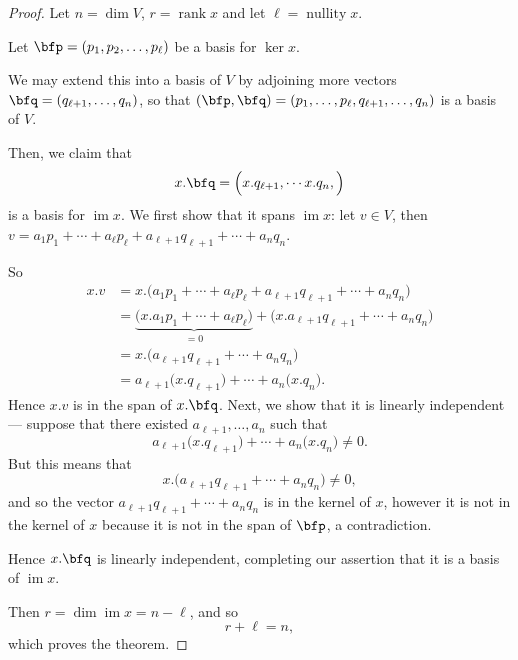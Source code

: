 \documentclass{article}
\DeclareMathOperator{\im}{im}
\DeclareMathOperator{\rank}{rank}
\DeclareMathOperator{\nullity}{nullity}
\newcommand*\acts{.}
\begin{document}
\begin{proof}
    Let $n = \dim V$, $r = \rank x$ and let $\ell = \nullity x$.

    Let $\bfp=(p_1,p_2,\ldots,p_\ell)$ be a basis for $\ker x$.

    We may extend this into a basis of $V$ by adjoining more vectors $\bfq=(q_{\ell+1},\ldots,q_n)$, so that $(\bfp,\bfq) = (p_1,\ldots,p_\ell,q_{\ell+1},\ldots,q_n)$ is a basis of $V$.

    Then, we claim that
    \[
        x \acts \bfq
        =
        \Big(
            x \acts q_{\ell+1},
            \cdots
            x \acts q_n,
        \Big)
    \]
    is a basis for $\im x$.
    We first show that it spans $\im x$: let $v \in V$, then $v = a_1p_1 + \cdots + a_\ell p_\ell + a_{\ell+1} q_{\ell+1} + \cdots + a_nq_n$.

    So
    \begin{align*}
        x \acts v
        &=
        x \acts 
        \Big(
            a_1p_1 + \cdots + a_\ell p_\ell + a_{\ell+1} q_{\ell+1} + \cdots + a_n q_n
        \Big)
        \\
        &=
        \underbrace{
            \Big(
                x \acts a_1p_1 + \cdots + a_\ell p_\ell
            \Big)
        }_{=0}
        + 
        \Big(
            x \acts a_{\ell+1} q_{\ell+1} + \cdots + a_n q_n
        \Big)
        \\
        &=
        x \acts 
        \Big(
            a_{\ell+1} q_{\ell+1} + \cdots + a_n q_n
        \Big)
        \\
        &=
        a_{\ell+1}\Big(
            x \acts q_{\ell+1}
        \Big)
        + \cdots
        + a_n\Big(
            x \acts q_n
        \Big).
    \end{align*}
    Hence $x \acts v$ is in the span of $x \acts \bfq$.
    Next, we show that it is linearly independent--- suppose that there existed $a_{\ell+1}, \ldots, a_n$ such that
    \[
        a_{\ell+1}\Big(
            x \acts q_{\ell+1}
        \Big)
        + \cdots
        + a_n\Big(
            x \acts q_n
        \Big)
        \neq
        0.
    \]
    But this means that
    \[
        x \acts 
        \Big(
            a_{\ell+1} q_{\ell+1} + \cdots + a_n q_n
        \Big)
        \neq
        0,
    \]
    and so the vector $a_{\ell+1} q_{\ell+1} + \cdots + a_n q_n$ is in the kernel of $x$, however it is not in the kernel of $x$ because it is not in the span of $\bfp$, a contradiction.

    Hence $x \acts \bfq$ is linearly independent, completing our assertion that it is a basis of $\im x$.

    Then $r = \dim \im x = n - \ell$, and so
    \[
        r + \ell 
        = 
        n,
    \]
    which proves the theorem.
\end{proof}
\end{document}
